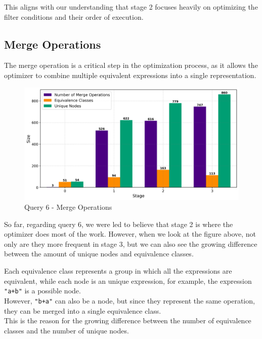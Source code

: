 \documentclass[a4paper,12pt]{scrreprt}
\begin{document}
This aligns with our understanding that stage 2 focuses heavily on optimizing the filter conditions and their order of execution.


\subsection{Merge Operations}

The merge operation is a critical step in the optimization process, as it allows the optimizer to combine multiple equivalent expressions into a single representation. 

\begin{figure}[H]
    \centering
    \includegraphics[width=\linewidth]{img_merges/q6_sizes.png}
    \caption{Query 6 - Merge Operations}
    \label{fig:merge1}
\end{figure}

So far, regarding query 6, we were led to believe that stage 2 is where the optimizer does most of the work. However, when we look at the figure above, not only are they more frequent in stage 3, but we can also see the growing difference between the amount of unique nodes and equivalence classes. 

Each equivalence class represents a group in which all the expressions are equivalent, while each node is an unique expression, for example, the expression \texttt{"a+b"} is a possible node.\\ 
However, \texttt{"b+a"} can also be a node, but since they represent the same operation, they can be merged into a single equivalence class. \\
This is the reason for the growing difference between the number of equivalence classes and the number of unique nodes. \\


\end{document}
